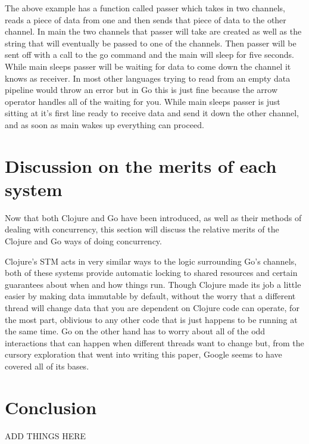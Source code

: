 \documentclass{acm_proc_article-sp}
\begin{document}
		The above example has a function called passer which takes in two channels, reads a piece of data from one and then sends that piece of data to the other channel. In main the two channels that passer will take are created as well as the string that will eventually be passed to one of the channels. Then passer will be sent off with a call to the go command and the main will sleep for five seconds. While main sleeps passer will be waiting for data to come down the channel it knows as receiver. In most other languages trying to read from an empty data pipeline would throw an error but in Go this is just fine because the arrow operator handles all of the waiting for you. While main sleeps passer is just sitting at it's first line ready to receive data and send it down the other channel, and as soon as main wakes up everything can proceed.
		
\section{Discussion on the merits of each system}
	Now that both Clojure and Go have been introduced, as well as their methods of dealing with concurrency, this section will discuss the relative merits of the Clojure and Go ways of doing concurrency.
	
	Clojure's STM acts in very similar ways to the logic surrounding Go's channels, both of these systems provide automatic locking to shared resources and certain guarantees about when and how things run. Though Clojure made its job a little easier by making data immutable by default, without the worry that a different thread will change data that you are dependent on Clojure code can operate, for the most part, oblivious to any other code that is just happens to be running at the same time. Go on the other hand has to worry about all of the odd interactions that can happen when different threads want to change but, from the cursory exploration that went into writing this paper, Google seems to have covered all of its bases.
	
\section{Conclusion}
	ADD THINGS HERE



\end{document}
